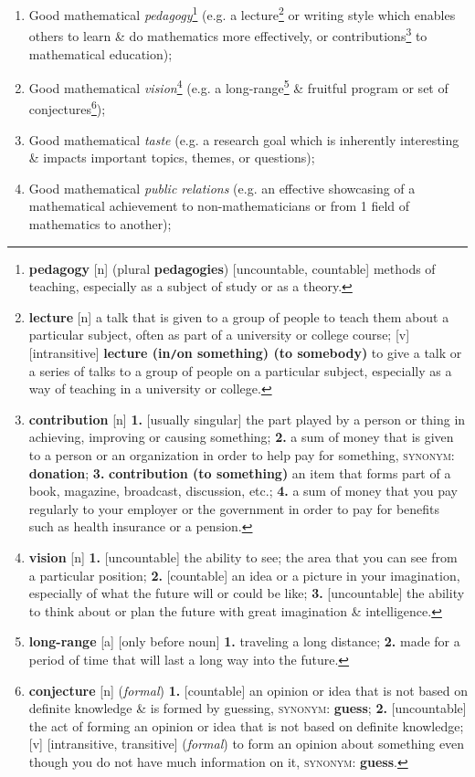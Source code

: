 \documentclass[oneside]{book}
\numberwithin{equation}{section}
\begin{document}
\begin{enumerate}
	\item Good mathematical \textit{pedagogy}\footnote{\textbf{pedagogy} [n] (plural \textbf{pedagogies}) [uncountable, countable] methods of teaching, especially as a subject of study or as a theory.} (e.g. a lecture\footnote{\textbf{lecture} [n] a talk that is given to a group of people to teach them about a particular subject, often as part of a university or college course; [v] [intransitive] \textbf{lecture (in\texttt{/}on something) (to somebody)} to give a talk or a series of talks to a group of people on a particular subject, especially as a way of teaching in a university or college.} or writing style which enables others to learn \& do mathematics more effectively, or contributions\footnote{\textbf{contribution} [n] \textbf{1.} [usually singular] the part played by a person or thing in achieving, improving or causing something; \textbf{2.} a sum of money that is given to a person or an organization in order to help pay for something, \textsc{synonym}: \textbf{donation}; \textbf{3.} \textbf{contribution (to something)} an item that forms part of a book, magazine, broadcast, discussion, etc.; \textbf{4.} a sum of money that you pay regularly to your employer or the government in order to pay for benefits such as health insurance or a pension.} to mathematical education);
	\item Good mathematical \textit{vision}\footnote{\textbf{vision} [n] \textbf{1.} [uncountable] the ability to see; the area that you can see from a particular position; \textbf{2.} [countable] an idea or a picture in your imagination, especially of what the future will or could be like; \textbf{3.} [uncountable] the ability to think about or plan the future with great imagination \& intelligence.} (e.g. a long-range\footnote{\textbf{long-range} [a] [only before noun] \textbf{1.} traveling a long distance; \textbf{2.} made for a period of time that will last a long way into the future.} \& fruitful program or set of conjectures\footnote{\textbf{conjecture} [n] (\textit{formal}) \textbf{1.} [countable] an opinion or idea that is not based on definite knowledge \& is formed by guessing, \textsc{synonym}: \textbf{guess}; \textbf{2.} [uncountable] the act of forming an opinion or idea that is not based on definite knowledge; [v] [intransitive, transitive] (\textit{formal}) to form an opinion about something even though you do not have much information on it, \textsc{synonym}: \textbf{guess}.});
	\item Good mathematical \textit{taste} (e.g. a research goal which is inherently interesting \& impacts important topics, themes, or questions);
	\item Good mathematical \textit{public relations} (e.g. an effective showcasing of a mathematical achievement to non-mathematicians or from 1 field of mathematics to another);
\end{enumerate}  


\printbibliography[heading=bibintoc]
	
\end{document}
